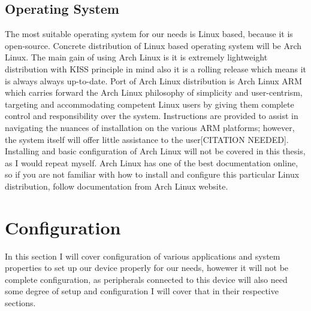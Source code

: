 \subsection{Operating System}
The most suitable operating system for our needs is Linux based, because it is open-source. Concrete distribution of Linux based operating system will be Arch Linux. The main gain of using Arch Linux is it is extremely lightweight distribution with KISS principle in mind also it is a rolling release which means it is always always up-to-date. Port of Arch Linux distribution is Arch Linux ARM which carries forward the Arch Linux philosophy of simplicity and user-centrism, targeting and accommodating competent Linux users by giving them complete control and responsibility over the system. Instructions are provided to assist in navigating the nuances of installation on the various ARM platforms; however, the system itself will offer little assistance to the user[CITATION NEEDED].
Installing and basic configuration of Arch Linux will not be covered in this thesis, as I would repeat myself. Arch Linux has one of the best documentation online, so if you are not familiar with how to install and configure this particular Linux distribution, follow documentation from Arch Linux website.
\newpage
\section{Configuration} %
\label{sec:configuration}
In this section I will cover configuration of various applications and system properties to set up our device properly for our needs, howewer it will not be complete configuration, as peripherals connected to this device will also need some degree of setup and configuration I will cover that in their respective sections.
